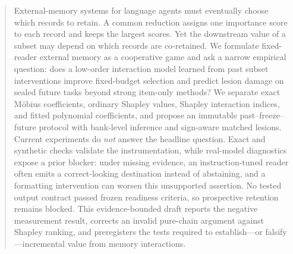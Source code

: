 \begin{abstract}
External-memory systems for language agents must eventually choose which records to
retain. A common reduction assigns one importance score to each record and keeps the
largest scores. Yet the downstream value of a subset may depend on which records are
co-retained. We formulate fixed-reader external memory as a cooperative game and ask
a narrow empirical question: does a low-order interaction model learned from past
subset interventions improve fixed-budget selection and predict lesion damage on
sealed future tasks beyond strong item-only methods? We separate exact M\"obius
coefficients, ordinary Shapley values, Shapley interaction indices, and fitted
polynomial coefficients, and propose an immutable past--freeze--future protocol with
bank-level inference and sign-aware matched lesions. Current experiments do
\emph{not} answer the headline question. Exact and synthetic checks validate the
instrumentation, while real-model diagnostics expose a prior blocker: under missing
evidence, an instruction-tuned reader often emits a correct-looking destination
instead of abstaining, and a formatting intervention can worsen this unsupported
assertion. No tested output contract passed frozen readiness criteria, so prospective
retention remains blocked. This evidence-bounded draft reports the negative
measurement result, corrects an invalid pure-chain argument against Shapley ranking,
and preregisters the tests required to establish---or falsify---incremental value
from memory interactions.
\end{abstract}
